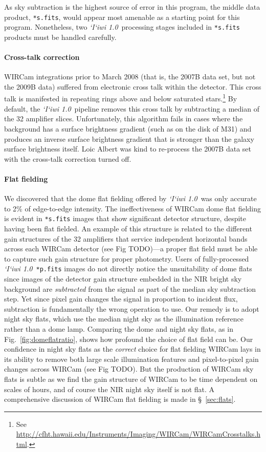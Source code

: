 \documentclass[iop]{emulateapj}
\newcommand{\sw}[1]{\textit{#1}} %
\newcommand{\iiwione}{\sw{`I`iwi 1.0}}
\newcommand{\todo}[1]{\textcolor{RedOrange}{#1}} %
\newcommand{\Fig}[1]{Fig.~\ref{fig:#1}}  %
\begin{document}
As sky subtraction is the highest source of error in this program, the middle data product, \texttt{*s.fits}, would appear most amenable as a starting point for this program.
Nonetheless, two \iiwione\ processing stages included in \texttt{*s.fits} products must be handled carefully.

\paragraph{Cross-talk correction} WIRCam integrations prior to March 2008 (that is, the 2007B data set, but not the 2009B data) suffered from electronic cross talk within the detector.
This cross talk is manifested in repeating rings above and below saturated stars.\footnote{See \url{http://cfht.hawaii.edu/Instruments/Imaging/WIRCam/WIRCamCrosstalks.html}.}
By default, the \iiwione\ pipeline removes this cross talk by subtracting a median of the 32 amplifier slices.
Unfortunately, this algorithm fails in cases where the background has a surface brightness gradient (such as on the disk of M31) and produces an inverse surface brightness gradient that is stronger than the galaxy surface brightness itself.
Loic Albert was kind to re-process the 2007B data set with the cross-talk correction turned off.

\paragraph{Flat fielding} We discovered that the dome flat fielding offered by \iiwione\ was only accurate to 2\% of edge-to-edge intensity.
The ineffectiveness of WIRCam dome flat fielding is evident in \texttt{*s.fits} images that show significant detector structure, despite having been flat fielded.
An example of this structure is related to the different gain structures of the 32 amplifiers that service independent horizontal bands across each WIRCam detector (see Fig \todo{TODO})---a proper flat field must be able to capture such gain structure for proper photometry.
Users of fully-processed \iiwione\ \texttt{*p.fits} images do not directly notice the unsuitability of dome flats since images of the detector gain structure embedded in the NIR bright sky background are \textit{subtracted} from the signal as part of the median sky subtraction step.
Yet since pixel gain changes the signal in proportion to incident flux, subtraction is fundamentally the wrong operation to use.
Our remedy is to adopt night sky flats, which use the median night sky as the illumination reference rather than a dome lamp.
Comparing the dome and night sky flats, as in \Fig{domeflatratio}, shows how profound the choice of flat field can be.
Our confidence in night sky flats as the \textit{correct} choice for flat fielding WIRCam lays in its ability to remove both large scale illumination features and pixel-to-pixel gain changes across WIRCam (see Fig \todo{TODO}).
But the production of WIRCam sky flats is subtle as we find the gain structure of WIRCam to be time dependent on scales of hours, and of course the NIR night sky itself is not flat.
A comprehensive discussion of WIRCam flat fielding is made in \S~\ref{sec:flats}.
\end{document}
